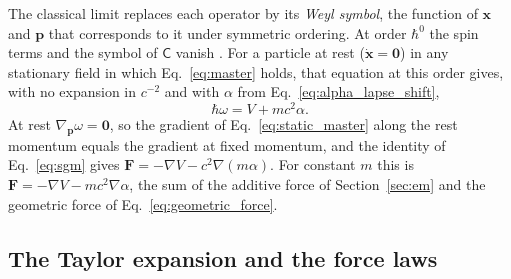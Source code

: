 \documentclass[aps,prd,onecolumn,tightenlines,nofootinbib,notitlepage,11pt,floatfix]{revtex4-2}
\theoremstyle{indentedtheorem}
\begin{document}
The classical limit replaces each operator by its \emph{Weyl symbol}, the function of $\mathbf{x}$ and $\mathbf{p}$ that corresponds to it under symmetric ordering. At order $\hbar^0$ the spin terms and the symbol of $\mathsf{C}$ vanish \citep{HutchisonWavefn2026,PanatiSpohnTeufel2003Space}. For a particle at rest ($\dot{\mathbf{x}}=\mathbf{0}$) in any stationary field in which Eq.~\eqref{eq:master} holds, that equation at this order gives, with no expansion in $c^{-2}$ and with $\alpha$ from Eq.~\eqref{eq:alpha_lapse_shift},
\begin{equation}
    \hbar\omega = V + mc^2\alpha .
    \label{eq:static_master}
\end{equation}
At rest $\nabla_{\mathbf{p}}\omega=\mathbf{0}$, so the gradient of Eq.~\eqref{eq:static_master} along the rest momentum equals the gradient at fixed momentum, and the identity of Eq.~\eqref{eq:sgm} gives $\mathbf{F}=-\nabla V-c^2\nabla(m\alpha)$. For constant $m$ this is $\mathbf{F}=-\nabla V-mc^2\nabla\alpha$, the sum of the additive force of Section~\ref{sec:em} and the geometric force of Eq.~\eqref{eq:geometric_force}.

\subsection{The Taylor expansion and the force laws}
\label{sec:expansion_orders}
\end{document}
